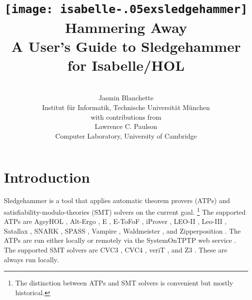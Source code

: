 \documentclass[a4paper,12pt]{article}
\renewcommand\_{\hbox{\textunderscore\kern-.05ex}}
\begin{document}
\renewcommand\labelitemi{\raise.065ex\hbox{\small\textbullet}}

\title{\texttt{[image: isabelle\_sledgehammer]} \\[4ex]
Hammering Away \\[\smallskipamount]
\Large A User's Guide to Sledgehammer for Isabelle/HOL}
\author{\hbox{} \\
Jasmin Blanchette \\
{\normalsize Institut f\"ur Informatik, Technische Universit\"at M\"unchen} \\[4\smallskipamount]
{\normalsize with contributions from} \\[4\smallskipamount]
Lawrence C. Paulson \\
{\normalsize Computer Laboratory, University of Cambridge} \\
\hbox{}}

\maketitle

\tableofcontents

\setlength{\parskip}{.7em plus .2em minus .1em}
\setlength{\parindent}{0pt}
\setlength{\abovedisplayskip}{\parskip}
\setlength{\abovedisplayshortskip}{.9\parskip}
\setlength{\belowdisplayskip}{\parskip}
\setlength{\belowdisplayshortskip}{.9\parskip}

\newenvironment{enum}%
    {\begin{list}{}{%
        \setlength{\topsep}{.1\parskip}%
        \setlength{\partopsep}{.1\parskip}%
        \setlength{\itemsep}{\parskip}%
        \advance\itemsep by-\parsep}}
    {\end{list}}

\def\pre{\begingroup\vskip0pt plus1ex\advance\leftskip by\leftmargin
\advance\rightskip by\leftmargin}
\def\post{\vskip0pt plus1ex\endgroup}

\def\prew{\pre\advance\rightskip by-\leftmargin}
\def\postw{\post}


\section{Introduction}
\label{introduction}

Sledgehammer is a tool that applies automatic theorem provers (ATPs)
and satisfiability-modulo-theories (SMT) solvers on the current goal.%
\footnote{The distinction between ATPs and SMT solvers is convenient but mostly
historical.}
%
The supported ATPs are AgsyHOL \cite{agsyHOL}, Alt-Ergo \cite{alt-ergo}, E
\cite{schulz-2002}, E-ToFoF \cite{tofof}, iProver \cite{korovin-2009}, LEO-II
\cite{leo2}, Leo-III \cite{leo3}, Satallax \cite{satallax}, SNARK
\cite{snark}, SPASS \cite{weidenbach-et-al-2009}, Vampire
\cite{riazanov-voronkov-2002}, Waldmeister \cite{waldmeister}, and
Zipperposition \cite{cruanes-2014}. The ATPs are run either locally or
remotely via the System\-On\-TPTP web service \cite{sutcliffe-2000}. The
supported SMT solvers are CVC3 \cite{cvc3}, CVC4 \cite{cvc4}, veriT
\cite{bouton-et-al-2009}, and Z3 \cite{z3}. These are always run locally.
\end{document}
